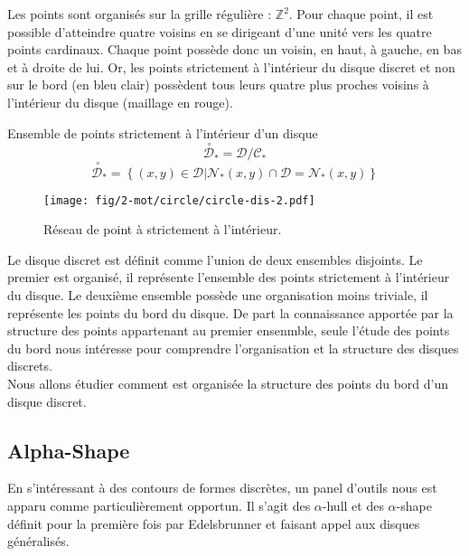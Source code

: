 Les points sont organisés sur la grille régulière : $\mathbb{Z}^{2}$. Pour chaque point, il est possible d'atteindre quatre voisins en se dirigeant d'une unité vers les quatre points cardinaux. Chaque point possède donc un voisin, en haut, à gauche, en bas et à droite de lui. Or, les points strictement à l'intérieur du disque discret et non sur le bord (en bleu clair) possèdent tous leurs quatre plus proches voisins à l'intérieur du disque (maillage en rouge).

\begin{Definition}{Ensemble de points strictement à l'intérieur d'un disque}
\label{def:int-ens}
  $$\stackrel{\ \circ}{\mathcal{D}}_{*} = \mathcal{D} / \mathcal{C_{*}} $$
  $$ \stackrel{\ \circ}{\mathcal{D}}_{*} =  \left\{ (x,y) \in \mathcal{D} | \mathcal{N}_{*}(x,y) \cap \mathcal{D} = \mathcal{N}_{*}(x,y) \right\}$$
\end{Definition}

\begin{figure}[H]
  \centering
  \texttt{[image: fig/2-mot/circle/circle-dis-2.pdf]}
  \caption{Réseau de point à strictement à l'intérieur.}
\end{figure}

Le disque discret est définit comme l'union de deux ensembles disjoints. Le premier est organisé, il représente l'ensemble des points strictement à l'intérieur du disque. Le deuxième ensemble possède une organisation moins triviale, il représente les points du bord du disque. De part la connaissance apportée par la structure des points appartenant au premier ensenmble, seule l'étude des points du bord nous intéresse pour comprendre l'organisation et la structure des disques discrets.\\

Nous allons étudier comment est organisée la structure des points du bord d'un disque discret.

\subsection{Alpha-Shape}

En s'intéressant à des contours de formes discrètes, un panel d'outils nous est apparu comme particulièrement opportun. Il s'agit des $\alpha$-hull et des $\alpha$-shape définit pour la première fois par Edelsbrunner \cite{EdeKirSei83} et faisant appel aux disques généralisés.\\

